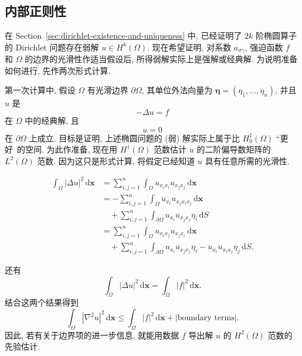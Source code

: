 \subsection{内部正则性}\label{sec:elliptic-interior-regularity}

在 Section~\ref{sec:dirichlet-existence-and-uniqueness} 中, 已经证明了 $2k$ 阶椭圆算子的 Dirichlet 问题存在弱解 $u\in H^k(\Omega)$. 现在希望证明, 对系数 $a_{\sigma\gamma}$, 强迫函数 $f$ 和 $\Omega$ 的边界的光滑性作适当假设后, 所得弱解实际上是强解或经典解. 为说明准备如何进行, 先作两次形式计算.

第一次计算中, 假设 $\Omega$ 有光滑边界 $\partial\Omega$, 其单位外法向量为 $\bm{\eta}=(\eta_1,\ldots,\eta_n)$, 并且 $u$ 是
\begin{equation}\label{eq:interior-regularity-formal-poisson-equation}
-\Delta u=f
\end{equation}
在 $\Omega$ 中的经典解, 且
\begin{equation}\label{eq:interior-regularity-formal-dirichlet-boundary}
u=0
\end{equation}
在 $\partial\Omega$ 上成立. 目标是证明, 上述椭圆问题的 (弱) 解实际上属于比 $H_0^1(\Omega)$ ``更好\textquotesingle\textquotesingle\ 的空间. 为此作准备, 现在用 $H^1(\Omega)$ 范数估计 $u$ 的二阶偏导数矩阵的 $L^2(\Omega)$ 范数. 因为这只是形式计算, 将假定已经知道 $u$ 具有任意所需的光滑性.

\[\begin{aligned}
\int_\Omega|\Delta u|^2\,\mathrm{d}\bm{x}
&=\sum_{i,j=1}^n\int_\Omega u_{x_ix_i}u_{x_jx_j}\,\mathrm{d}\bm{x}\\
&=-\sum_{i,j=1}^n\int_\Omega u_{x_i}u_{x_jx_ix_j}\,\mathrm{d}\bm{x}\\
&\quad+\sum_{i,j=1}^n\int_{\partial\Omega}u_{x_i}u_{x_jx_j}\eta_i\,\mathrm{d}S\\
&=\sum_{i,j=1}^n\int_\Omega u_{x_ix_j}u_{x_jx_i}\,\mathrm{d}\bm{x}\\
&\quad+\sum_{i,j=1}^n\int_{\partial\Omega}u_{x_i}u_{x_jx_j}\eta_i-u_{x_i}u_{x_ix_j}\eta_j\,\mathrm{d}S.
\end{aligned}\]

还有
\begin{equation}\label{eq:interior-regularity-formal-laplacian-data-identity}
\int_\Omega|\Delta u|^2\,\mathrm{d}\bm{x}=\int_\Omega|f|^2\,\mathrm{d}\bm{x}.
\end{equation}
结合这两个结果得到
\begin{equation}\label{eq:interior-regularity-formal-hessian-boundary-estimate}
\int_\Omega|\nabla^2u|^2\,\mathrm{d}\bm{x}\leq\int_\Omega|f|^2\,\mathrm{d}\bm{x}+|\text{boundary terms}|.
\end{equation}
因此, 若有关于边界项的进一步信息, 就能用数据 $f$ 导出解 $u$ 的 $H^2(\Omega)$ 范数的先验估计.

